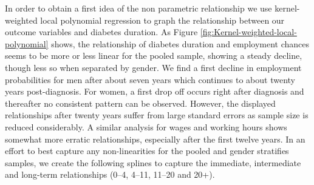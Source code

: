 In order to obtain a first idea of the non parametric relationship
we use kernel-weighted local polynomial regression to graph the relationship
between our outcome variables and diabetes duration. As Figure \ref{fig:Kernel-weighted-local-polynomial}
shows, the relationship of diabetes duration and employment chances
seems to be more or less linear for the pooled sample, showing a steady
decline, though less so when separated by gender. We find a first
decline in employment probabilities for men after about seven years
which continues to about twenty years post-diagnosis. For women,
a first drop off occurs right after diagnosis and thereafter no consistent
pattern can be observed. However, the displayed relationships after
twenty years suffer from large standard errors as sample size is reduced
considerably. A similar analysis for wages and working hours shows
somewhat more erratic relationships, especially after the first twelve
years. In an effort to best capture any non-linearities for the pooled
and gender stratifies samples, we create the following splines to
capture the immediate, intermediate and long-term relationships (0--4,
4--11, 11--20 and 20+).   
  
  
  
  
  
  
  
  
  
  
  
  
  
  
  